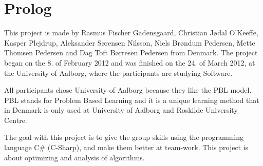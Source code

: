 \chapter{Prolog}

This project is made by Rasmus Fischer Gadensgaard, Christian Jødal O’Keeffe, Kasper Plejdrup, Aleksander Sørensen Nilsson, Niels Brøndum Pedersen, Mette Thomsen Pedersen and Dag Toft Børresen Pedersen from Denmark. The project began on the 8. of February 2012 and was finished on the 24. of March 2012, at the University of Aalborg, where the participants are studying Software.

All participants chose University of Aalborg because they like the PBL model. PBL stands for Problem Based Learning and it is a unique learning method that in Denmark is only used at University of Aalborg and Roskilde University Centre.

The goal with this project is to give the group skills using the programming language C\# (C-Sharp), and make them better at team-work. This project is about optimizing and analysis of algorithms.